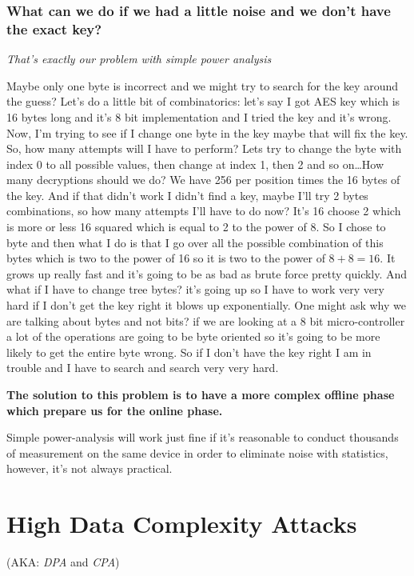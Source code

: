 \subsubsection{What can we do if we had a little noise and we don't have the exact key?}

\textit{That's exactly our problem with simple power analysis}

Maybe only one byte is incorrect and we might try to search for the key around
the guess? Let's do a little bit of combinatorics: let's say I got AES key which
is 16 bytes long and it's 8 bit implementation and I tried the key and it's
wrong. Now, I'm trying to see if I change one byte in the key maybe that will
fix the key. So, how many attempts will I have to perform? Lets try to change
the byte with index 0 to all possible values, then change at index 1, then 2 and
so on\ldots How many decryptions should we do? We have 256 per position
times the 16 bytes of the key. And if that didn't work I didn't find a key,
maybe I'll try 2 bytes combinations, so how many attempts I'll have to do now?
It's 16 choose 2 which is more or less 16 squared which is equal to 2 to the power of 8.
So I chose to byte and then what I do is that I go over all the
possible combination of this bytes which is two to the power of 16 so it is two
to the power of $8+8=16$. It grows up really fast and it's going to be as bad as
brute force pretty quickly. And what if I have to change tree bytes? it's going
up so I have to work very very hard if I don't get the key right it blows up
exponentially. One might ask why we are talking about bytes and not bits? if we
are looking at a 8 bit micro-controller a lot of the operations are going to be
byte oriented so it's going to be more likely to get the entire byte wrong. So
if I don't have the key right I am in trouble and I have to search and search
very very hard. 

\textbf{The solution to this problem is to have a more complex offline phase which prepare us for the online phase.}

Simple power-analysis will work just fine if it's reasonable to conduct
thousands of measurement on the same device in order to eliminate noise with
statistics, however, it's not always practical.

\section{High Data Complexity Attacks}

(AKA: \textit{DPA} and \textit{CPA})

